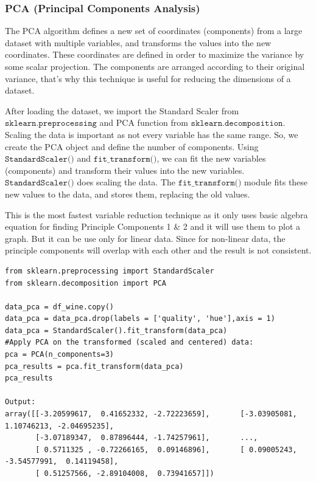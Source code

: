 \subsubsection{PCA (Principal Components Analysis)}
The PCA algorithm defines a new set of coordinates (components) from a large dataset with multiple variables, and transforms the values into the new coordinates. These coordinates are defined in order to maximize the variance by some scalar projection. The components are arranged according to their original variance, that's why this technique is useful for reducing the dimensions of a dataset.

After loading the dataset, we import the Standard Scaler from $\texttt{sklearn.preprocessing}$ and PCA function from $\texttt{sklearn.decomposition}$. Scaling the data is important as not every variable has the same range. So, we create the PCA object and define the number of components. Using $\texttt{StandardScaler()}$ and $\texttt{fit\_transform()}$, we can fit the new variables (components) and transform their values into the new variables. $\texttt{StandardScaler()}$ does scaling the data. The $\texttt{fit\_transform()}$ module fits these new values to the data, and stores them, replacing the old values.


This is the most fastest variable reduction technique as it only uses basic algebra equation for finding Principle Components 1 \& 2 and it will use them to plot a graph. But it can be use only for linear data. Since for non-linear data, the principle components will overlap with each other and the result is not consistent.

\begin{lstlisting}[style=mypython]
from sklearn.preprocessing import StandardScaler
from sklearn.decomposition import PCA

data_pca = df_wine.copy()
data_pca = data_pca.drop(labels = ['quality', 'hue'],axis = 1)
data_pca = StandardScaler().fit_transform(data_pca)
#Apply PCA on the transformed (scaled and centered) data:
pca = PCA(n_components=3)
pca_results = pca.fit_transform(data_pca)
pca_results

Output:
array([[-3.20599617,  0.41652332, -2.72223659],       [-3.03905081,  1.10746213, -2.04695235],
       [-3.07189347,  0.87896444, -1.74257961],       ...,
       [ 0.5711325 , -0.72266165,  0.09146896],       [ 0.09005243, -3.54577991,  0.14119458],
       [ 0.51257566, -2.89104008,  0.73941657]])
\end{lstlisting}

